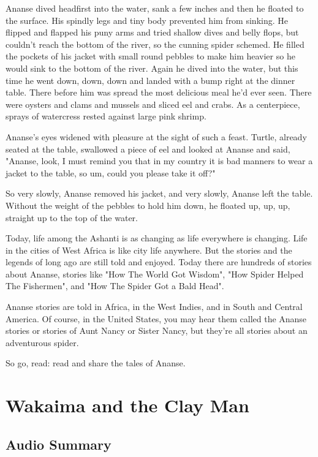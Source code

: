 Ananse dived headfirst into the water, sank a few inches and then he floated to the surface. His spindly legs and tiny body prevented him from sinking. He flipped and flapped his puny arms and tried shallow dives and belly flops, but couldn't reach the bottom of the river, so the cunning spider schemed. He filled the pockets of his jacket with small round pebbles to make him heavier so he would sink to the bottom of the river. Again he dived into the water, but this time he went down, down, down and landed with a bump right at the dinner table. There before him was spread the most delicious meal he'd ever seen. There were oysters and clams and mussels and sliced eel and crabs. As a centerpiece, sprays of watercress rested against large pink shrimp.

Ananse's eyes widened with pleasure at the sight of such a feast. Turtle, already seated at the table, swallowed a piece of eel and looked at Ananse and said, "Ananse, look, I must remind you that in my country it is bad manners to wear a jacket to the table, so um, could you please take it off?"

So very slowly, Ananse removed his jacket, and very slowly, Ananse left the table. Without the weight of the pebbles to hold him down, he floated up, up, up, straight up to the top of the water.

Today, life among the Ashanti is as changing as life everywhere is changing. Life in the cities of West Africa is like city life anywhere. But the stories and the legends of long ago are still told and enjoyed. Today there are hundreds of stories about Ananse, stories like "How The World Got Wisdom", "How Spider Helped The Fishermen", and "How The Spider Got a Bald Head".

Ananse stories are told in Africa, in the West Indies, and in South and Central America. Of course, in the United States, you may hear them called the Ananse stories or stories of Aunt Nancy or Sister Nancy, but they're all stories about an adventurous spider.

So go, read: read and share the tales of Ananse.

\section{Wakaima and the Clay Man}

\subsection{Audio Summary}

